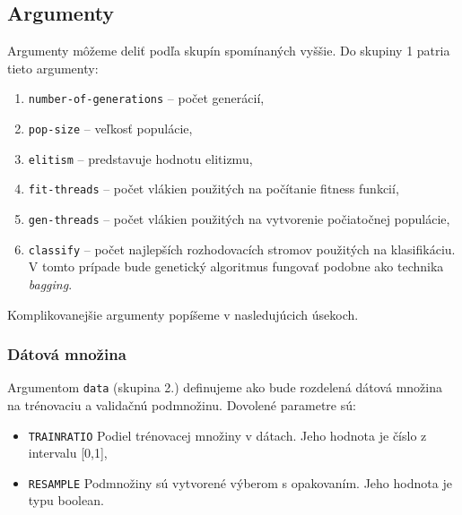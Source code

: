\subsection{Argumenty}
Argumenty môžeme deliť podľa skupín spomínaných vyššie. Do skupiny 1 patria tieto argumenty:
\begin{enumerate}
\item \texttt{number-of-generations} -- počet generácií,
\item \texttt{pop-size} -- veľkosť populácie,
\item \texttt{elitism} -- predstavuje hodnotu elitizmu,
\item \texttt{fit-threads} -- počet vlákien použitých na počítanie fitness funkcií,
\item \texttt{gen-threads} -- počet vlákien použitých na vytvorenie počiatočnej populácie,
\item \texttt{classify} -- počet najlepších rozhodovacích stromov použitých na klasifikáciu. V tomto prípade bude genetický algoritmus fungovať podobne ako technika \emph{bagging}.
\end{enumerate}
Komplikovanejšie argumenty popíšeme v nasledujúcich úsekoch.

\subsubsection*{Dátová množina}
Argumentom \verb|data| (skupina 2.) definujeme ako bude rozdelená dátová množina na trénovaciu a validačnú podmnožinu. 
Dovolené parametre sú:
\begin{itemize}
\item \verb|TRAINRATIO| Podiel trénovacej množiny v dátach. Jeho hodnota je číslo z intervalu [0,1],
\item \verb|RESAMPLE| Podmnožiny sú vytvorené výberom s opakovaním. Jeho hodnota je typu boolean.
\end{itemize}


